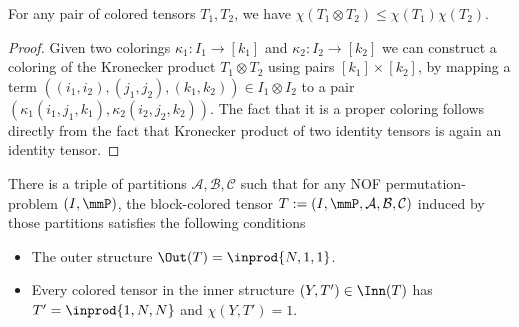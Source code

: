 \begin{fact}
\label{fct:chromatic-numbers-product}
For any pair of colored tensors $T_1, T_2$, we have $\chi(T_1 \otimes T_2) \leq \chi(T_1) \chi(T_2)$.
\end{fact}
\begin{proof}
    Given two colorings $\kappa_1 : I_1 \to [k_1]$ and $\kappa_2 : I_2 \to [k_2]$ we can construct a coloring of the Kronecker product $T_1 \otimes T_2$ using pairs $[k_1] \times [k_2]$, by mapping a term $( (i_1, i_2), (j_1, j_2), (k_1, k_2)) \in I_1 \otimes I_2$ to a pair $(\kappa_1(i_1, j_1, k_1), \kappa_2(i_2,j_2,k_2))$. The fact that it is a proper coloring follows directly from the fact that Kronecker product of two identity tensors is again an identity tensor.
\end{proof}

\begin{lemma}
\label{lem:block-perm}
There is a triple of partitions $\mathcal{A}, \mathcal{B}, \mathcal{C}$ such that for any NOF permutation-problem $(I,\mmP)$, the block-colored tensor $T := (I, \mmP, \mathcal{A}, \mathcal{B}, \mathcal{C})$ induced by those partitions satisfies the following conditions
\begin{itemize}
    \item The outer structure $\Out(T) = \inprod{N, 1, 1}$.
    \item Every colored tensor in the inner structure $(Y, T') \in \Inn(T)$ has $T' = \inprod{1,N,N}$ and $\chi(Y, T') = 1$.
\end{itemize}
\end{lemma} 
